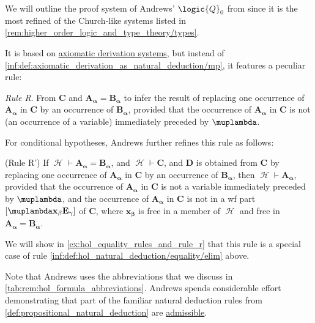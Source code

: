 \begin{remark}\label{rem:hol_axiomatic_derivations}
  We will outline the proof system of Andrews' \( \logic{Q}_0 \) from \cite[\S 51]{Andrews2002Logic} since it is the most refined of the Church-like systems listed in \cref{rem:higher_order_logic_and_type_theory/types}.

  It is based on \hyperref[def:propositional_axiomatic_derivation_system]{axiomatic derivation systems}, but instead of \ref{inf:def:axiomatic_derivation_as_natural_deduction/mp}, it features a peculiar rule:
  \begin{displayquote}
    \textit{Rule R}. From \( \mathbf{C} \) and \( \mathbf{A_\alpha} = \mathbf{B_\alpha} \) to infer the result of replacing one occurrence of \( \mathbf{A_\alpha} \) in \( \mathbf{C} \) by an occurrence of \( \mathbf{B_\alpha} \), provided that the occurrence of \( \mathbf{A_\alpha} \) in \( \mathbf{C} \) is not (an occurrence of a variable) immediately preceded by \( \muplambda \).
  \end{displayquote}

  For conditional hypotheses, Andrews further refines this rule as follows:
  \begin{displayquote}
    (Rule R') If \( \mscrH \vdash \mathbf{A_\alpha} = \mathbf{B_\alpha} \), and \( \mscrH \vdash \mathbf{C} \), and \( \mathbf{D} \) is obtained from \( \mathbf{C} \) by replacing one occurrence of \( \mathbf{A_\alpha} \) in \( \mathbf{C} \) by an occurrence of \( \mathbf{B_\alpha} \), then \( \mscrH \vdash \mathbf{A_\alpha} \), provided that the occurrence of \( \mathbf{A_\alpha} \) in \( \mathbf{C} \) is not a variable immediately preceded by \( \mathbf{\muplambda} \), and the occurrence of \( \mathbf{A_\alpha} \) in \( \mathbf{C} \) is not in a wf part \( [\mathbf{\muplambda x_\beta E_\gamma}] \) of \( \mathbf{C} \), where \( \mathbf{x_\beta} \) is free in a member of \( \mscrH \) and free in \( \mathbf{A_\alpha} = \mathbf{B_\alpha} \).
  \end{displayquote}

  We will show in \cref{ex:hol_equality_rules_and_rule_r} that this rule is a special case of rule \ref{inf:def:hol_natural_deduction/equality/elim} above.

  Note that Andrews uses the abbreviations that we discuss in \cref{tab:rem:hol_formula_abbreviations}. Andrews spends considerable effort demonstrating that part of the familiar natural deduction rules from \cref{def:propositional_natural_deduction} are \hyperref[con:inference_rule_admissibility]{admissible}.


\end{remark}
